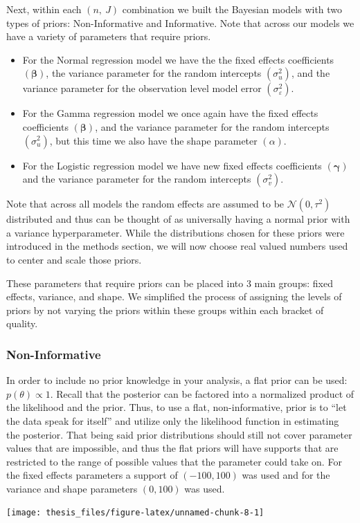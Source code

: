 \documentclass[12pt,twoside]{reedthesis}
\begin{document}
Next, within each \((n,\ J)\) combination we built the Bayesian models with two types of priors: Non-Informative and Informative. Note that across our models we have a variety of parameters that require priors.
\begin{itemize}
\item
  For the Normal regression model we have the the fixed effects coefficients \((\boldsymbol{\beta})\), the variance parameter for the random intercepts \((\sigma_u^2)\), and the variance parameter for the observation level model error \((\sigma_{\varepsilon}^2)\).
\item
  For the Gamma regression model we once again have the fixed effects coefficients \((\boldsymbol{\beta})\), and the variance parameter for the random intercepts \((\sigma_u^2)\), but this time we also have the shape parameter \((\alpha)\).
\item
  For the Logistic regression model we have new fixed effects coefficients \((\boldsymbol{\gamma})\) and the variance parameter for the random intercepts \((\sigma_v^2)\).
\end{itemize}
Note that across all models the random effects are assumed to be \(\mathcal{N}(0, \tau^2)\) distributed and thus can be thought of as universally having a normal prior with a variance hyperparameter. While the distributions chosen for these priors were introduced in the methods section, we will now choose real valued numbers used to center and scale those priors.

These parameters that require priors can be placed into 3 main groups: fixed effects, variance, and shape. We simplified the process of assigning the levels of priors by not varying the priors within these groups within each bracket of quality.

\hypertarget{non-informative}{%
\subsubsection{Non-Informative}\label{non-informative}}

In order to include no prior knowledge in your analysis, a flat prior can be used: \(p(\theta) \propto 1\). Recall that the posterior can be factored into a normalized product of the likelihood and the prior. Thus, to use a flat, non-informative, prior is to ``let the data speak for itself'' and utilize only the likelihood function in estimating the posterior. That being said prior distributions should still not cover parameter values that are impossible, and thus the flat priors will have supports that are restricted to the range of possible values that the parameter could take on. For the fixed effects parameters a support of \((-100, 100)\) was used and for the variance and shape parameters \((0, 100)\) was used.
\begin{center}\texttt{[image: thesis\_files/figure-latex/unnamed-chunk-8-1]} \end{center}
\end{document}
